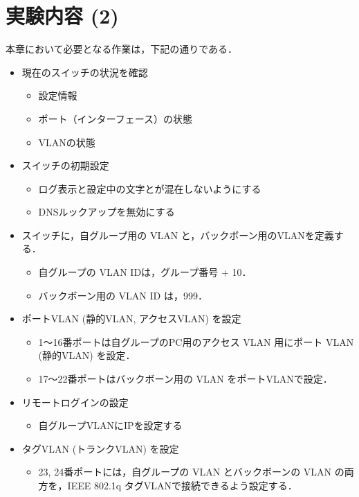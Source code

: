 \section{実験内容 (2)}
本章において必要となる作業は，下記の通りである．
\begin{itemize}
\item 現在のスイッチの状況を確認
    \begin{itemize}
    \item 設定情報
    \item ポート（インターフェース）の状態
    \item VLANの状態
    \end{itemize}
    
\item スイッチの初期設定
    \begin{itemize}
    \item ログ表示と設定中の文字とが混在しないようにする
    \item DNSルックアップを無効にする
    \end{itemize}
    
\item スイッチに，自グループ用の VLAN と，バックボーン用のVLANを定義する．
    \begin{itemize}
        \item 自グループの VLAN IDは，グループ番号 + 10．
        \item バックボーン用の VLAN ID は，999．
    \end{itemize}
    
\item ポートVLAN (静的VLAN, アクセスVLAN) を設定
    \begin{itemize}
        \item 1〜16番ポートは自グループのPC用のアクセス VLAN 用にポート VLAN (静的VLAN) を設定．
        \item 17〜22番ポートはバックボーン用の VLAN をポートVLANで設定．
    \end{itemize}
\item リモートログインの設定
    \begin{itemize}
        \item 自グループVLANにIPを設定する
    \end{itemize}
\item タグVLAN (トランクVLAN) を設定
    \begin{itemize}
        \item 23, 24番ポートには，自グループの VLAN とバックボーンの VLAN の両方を，IEEE 802.1q タグVLANで接続できるよう設定する．
    \end{itemize}


\end{itemize}
